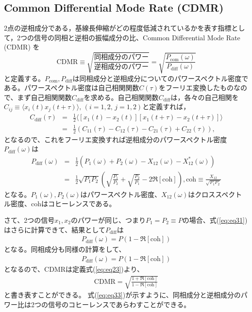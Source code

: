 \subsection{Common Differential Mode Rate (CDMR)}
2点の逆相成分である，基線長伸縮がどの程度低減されているかを表す指標として，2つの信号の同相と逆相の振幅成分の比、Common Differential Mode Rate (CDMR) を
\begin{equation}
  \boxed{\mathrm{CDMR} \equiv \sqrt{\frac{同相成分のパワー}{逆相成分のパワー}} = \sqrt{\frac{P_{\mathrm{com}}(\omega)}{P_{\mathrm{diff}}(\omega)}}} \label{eq:eq23}
\end{equation}
と定義する。$P_{\mathrm{com}},P_{\mathrm{diff}}$は同相成分と逆相成分についてのパワースペクトル密度である。パワースペクトル密度は自己相関関数$C(\tau)$をフーリエ変換したものなので、まず自己相関関数$C_{\mathrm{diff}}$を求める。自己相関関数$C_{\mathrm{diff}}$は，各々の自己相関を$ C_{ij} \equiv \langle x_{i}(t)x_{j}(t+\tau)\rangle,\, (i=1,2,\,j=1,2)$と定義すれば， 
\begin{eqnarray}
  C_{\mathrm{diff}}(\tau) &=& \frac{1}{2}
  \langle
  \left[ x_{1}(t)-x_{2}(t) \right]   \left[ x_{1}(t+\tau)-x_{2}(t+\tau) \right]
  \rangle \\
  &=& \frac{1}{2}\left( C_{11}(\tau) - C_{12}(\tau) - C_{21}(\tau) + C_{22}(\tau) \right), 
\end{eqnarray}
となるので、これをフーリエ変換すれば逆相成分のパワースペクトル密度$P_{\mathrm{diff}}(\omega)$は
\begin{eqnarray}
  P_{\mathrm{diff}}(\omega) &=& \frac{1}{2}\left( P_{1}(\omega) + P_{2}(\omega) - X_{12}(\omega) - X_{12}^*(\omega) \right)\\
  &=& \frac{1}{2} \sqrt{P_{1}P_{2}} \left( \sqrt{\frac{P_{1}}{P_{2}}}+ \sqrt{\frac{P_{2}}{P_{1}}} - 2\Re \left[\mathrm{coh} \right] \right) , 
\mathrm{coh} \equiv \frac{X_{12}}{\sqrt{P_{1}P_{2}}} \label{eq:eq31}
\end{eqnarray}
となる。$P_{1}(\omega),P_{2}(\omega)$はパワースペクトル密度、$X_{12}(\omega)$はクロススペクトル密度、$\mathrm{coh}$はコヒーレンスである。


さて、2つの信号$x_{1},x_{2}$のパワーが同じ、つまり$P_{1}=P_{2}\equiv P$の場合、式(\ref{eq:eq31})はさらに計算できて、結果として$P_{\mathrm{diff}}$は
\begin{eqnarray}
 P_{\mathrm{diff}}(\omega) = P \left(1 - \Re \left[\mathrm{coh} \right] \right) \label{eq:eq35}
\end{eqnarray}
となる。同相成分も同様の計算をして、
\begin{eqnarray}
 P_{\mathrm{diff}}(\omega) = P \left(1 - \Re \left[\mathrm{coh} \right] \right) \label{eq:eq36}
\end{eqnarray}
となるので、$\mathrm{CDMR}$は定義式(\ref{eq:eq23})より、
\begin{eqnarray}
 \mathrm{CDMR} = \sqrt{\frac{1 + \Re \left[\mathrm{coh} \right] }{1 - \Re \left[\mathrm{coh} \right]}} \label{eq:eq33}
\end{eqnarray}
と書き表すことができる。
式(\ref{eq:eq33})が示すように、同相成分と逆相成分のパワー比は2つの信号のコヒーレンスであらわすことができる。


